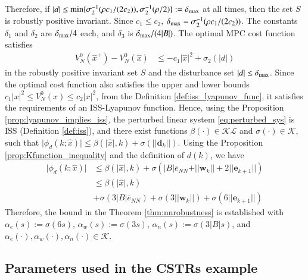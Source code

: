 \documentclass[preprint,5p, twocolumn, authoryear]{elsarticle}
\begin{document}
Therefore, if 
$\vert d \vert \leq \textnormal{min} \{ \sigma_2^{-1}(\rho c_1/(2c_2)), 
\sigma_2^{-1}(\rho/2)\} := \delta_{\textnormal{max}}$ 
at all times, then the set $S$ is 
robustly positive invariant. Since $c_1 \leq c_2$, 
$\delta_{\textnormal{max}} = \sigma_2^{-1}(\rho c_1/(2c_2))$.
The constants $\delta_1$ and $\delta_2$ are
$\delta_{\textnormal{max}}/4$ each, 
and $\delta_3$ is $\delta_{\textnormal{max}}/(4\vert B \vert)$.
The optimal MPC cost function satisfies
\begin{align*}
    V_N^0(\hat{x}^+) - V_N^0(\hat{x}) &\leq 
    -c_1\vert \hat{x} \vert^2 + \sigma_2(\vert d \vert)
\end{align*}
in the robustly positive invariant set $S$ and
the disturbance set $\vert d \vert \leq \delta_{\textnormal{max}}$.
Since the optimal cost function also satisfies the upper and lower bounds
$c_1\vert x \vert^2 \leq V_N^0(x) \leq c_2\vert x \vert^2$,
from the Definition \ref{def:iss_lyapunov_func},
it satisfies the requirements of an ISS-Lyapunov function.
Hence, using the Proposition \ref{prop:lyapunov_implies_iss}, 
the perturbed linear system \eqref{eq:perturbed_sys} is
ISS (Definition \ref{def:iss}), 
and there exist functions 
$\beta(\cdot) \in \mathcal{K}\mathcal{L}$ and 
$\sigma(\cdot) \in \mathcal{K}$, such that 
$\vert \phi_d(k; \hat{x}) \vert \leq \beta(\vert \hat{x} \vert, k) 
+ \sigma(\vert\vert \mathbf{d}_k\vert\vert)$. Using the Proposition
\ref{prop:Kfunction_inequality} and the definition of 
$d(k)$, we have 
\begin{align*}
    \vert \phi_d(k; \hat{x}) \vert & \leq \beta(\vert \hat{x} \vert, k)
    + \sigma(\vert B\vert\bar{e}_{NN} + \vert \vert \mathbf{w}_k \vert \vert
    + 2\vert \vert \mathbf{e}_{k+1} \vert \vert) \\
     & \leq \beta(\vert \hat{x} \vert, k) \\
    & +\sigma(3\vert B\vert\bar{e}_{NN}) + 
    \sigma(3\vert \vert \mathbf{w}_k \vert \vert)
    + \sigma(6\vert \vert \mathbf{e}_{k+1} \vert\vert)
\end{align*}
Therefore, the bound in the Theorem \ref{thm:nnrobustness} is established with 
$\alpha_e(s) := \sigma(6s)$, 
$\alpha_w(s) := \sigma(3s)$,
$\alpha_n(s) := \sigma(3\vert B\vert s)$, and 
$\alpha_e(\cdot), \alpha_w(\cdot), \alpha_n(\cdot) \in \mathcal{K}$.

\subsection{Parameters used in the CSTRs example} \label{app:cstrs_pars}
\end{document}
